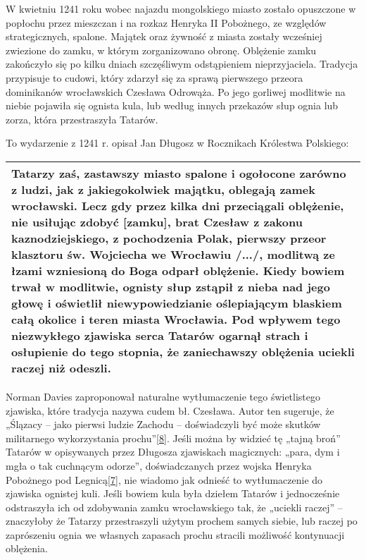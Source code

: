 \documentclass{article}
\begin{document}
\vspace{6pt}

\noindent W kwietniu 1241 roku wobec najazdu mongolskiego miasto zostało opuszczone w popłochu przez mieszczan i na rozkaz Henryka II Pobożnego, ze względów strategicznych, spalone. Majątek oraz żywność z miasta zostały wcześniej zwiezione do zamku, w którym zorganizowano obronę. Oblężenie zamku zakończyło się po kilku dniach szczęśliwym odstąpieniem nieprzyjaciela. Tradycja przypisuje to cudowi, który zdarzył się za sprawą pierwszego przeora dominikanów wrocławskich Czesława Odrowąża. Po jego gorliwej modlitwie na niebie pojawiła się ognista kula, lub według innych przekazów słup ognia lub zorza, która przestraszyła Tatarów.

\vspace{6pt}

\noindent To wydarzenie z 1241 r. opisał Jan Długosz w Rocznikach Królestwa Polskiego:

\begin {center}
\begin{tabular}{|p{12cm}|} \hline
Tatarzy zaś, zastawszy miasto spalone i ogołocone zarówno z ludzi, jak z jakiegokolwiek majątku, oblegają zamek wrocławski. Lecz gdy przez kilka dni przeciągali oblężenie, nie usiłując zdobyć [zamku], brat Czesław z zakonu kaznodziejskiego, z pochodzenia Polak, pierwszy przeor klasztoru św. Wojciecha we Wrocławiu /.../, modlitwą ze łzami wzniesioną do Boga odparł oblężenie. Kiedy bowiem trwał w modlitwie, ognisty słup zstąpił z nieba nad jego głowę i oświetlił niewypowiedzianie oślepiającym blaskiem całą okolice i teren miasta Wrocławia. Pod wpływem tego niezwykłego zjawiska serca Tatarów ogarnął strach i osłupienie do tego stopnia, że zaniechawszy oblężenia uciekli raczej niż odeszli.\\ \hline
\end{tabular}
\end{center}



\noindent Norman Davies zaproponował naturalne wytłumaczenie tego świetlistego zjawiska, które tradycja nazywa cudem bł. Czesława. Autor ten sugeruje, że „Ślązacy – jako pierwsi ludzie Zachodu – doświadczyli być może skutków militarnego wykorzystania prochu”\hyperref[8]{[8]}\label{18}. Jeśli można by widzieć tę „tajną broń” Tatarów w opisywanych przez Długosza zjawiskach magicznych: „para, dym i mgła o tak cuchnącym odorze”, doświadczanych przez wojska Henryka Pobożnego pod Legnicą\hyperref[7]{[7]}\label{17}, nie wiadomo jak odnieść to wytłumaczenie do zjawiska ognistej kuli. Jeśli bowiem kula była dziełem Tatarów i jednocześnie odstraszyła ich od zdobywania zamku wrocławskiego tak, że „uciekli raczej” – znaczyłoby że Tatarzy przestraszyli użytym prochem samych siebie, lub raczej po zaprószeniu ognia we własnych zapasach prochu stracili możliwość kontynuacji oblężenia.
\end{document}
